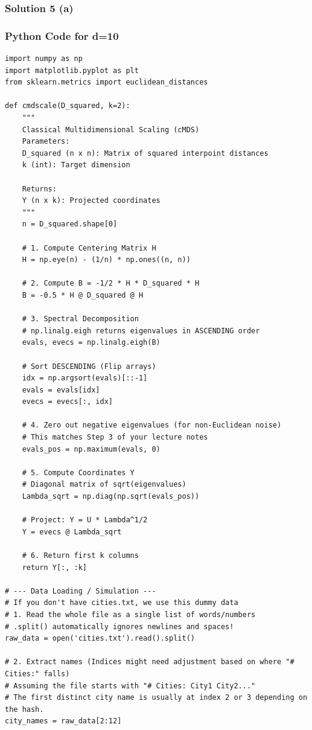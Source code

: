 \documentclass{article}
\begin{document}
\subsubsection*{Solution 5 (a)}

\subsubsection*{Python Code for d=10}
\begin{lstlisting}
import numpy as np
import matplotlib.pyplot as plt
from sklearn.metrics import euclidean_distances

def cmdscale(D_squared, k=2):
    """
    Classical Multidimensional Scaling (cMDS)
    Parameters:
    D_squared (n x n): Matrix of squared interpoint distances
    k (int): Target dimension
    
    Returns:
    Y (n x k): Projected coordinates
    """
    n = D_squared.shape[0]
    
    # 1. Compute Centering Matrix H
    H = np.eye(n) - (1/n) * np.ones((n, n))
    
    # 2. Compute B = -1/2 * H * D_squared * H
    B = -0.5 * H @ D_squared @ H
    
    # 3. Spectral Decomposition
    # np.linalg.eigh returns eigenvalues in ASCENDING order
    evals, evecs = np.linalg.eigh(B)
    
    # Sort DESCENDING (Flip arrays)
    idx = np.argsort(evals)[::-1]
    evals = evals[idx]
    evecs = evecs[:, idx]
    
    # 4. Zero out negative eigenvalues (for non-Euclidean noise)
    # This matches Step 3 of your lecture notes
    evals_pos = np.maximum(evals, 0)
    
    # 5. Compute Coordinates Y
    # Diagonal matrix of sqrt(eigenvalues)
    Lambda_sqrt = np.diag(np.sqrt(evals_pos))
    
    # Project: Y = U * Lambda^1/2
    Y = evecs @ Lambda_sqrt
    
    # 6. Return first k columns
    return Y[:, :k]

# --- Data Loading / Simulation ---
# If you don't have cities.txt, we use this dummy data
# 1. Read the whole file as a single list of words/numbers
# .split() automatically ignores newlines and spaces!
raw_data = open('cities.txt').read().split()

# 2. Extract names (Indices might need adjustment based on where "# Cities:" falls)
# Assuming the file starts with "# Cities: City1 City2..."
# The first distinct city name is usually at index 2 or 3 depending on the hash.
city_names = raw_data[2:12] 


\end{lstlisting}
\end{document}
